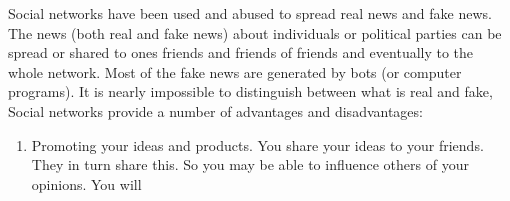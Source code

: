  Social networks have been used and abused to spread real news and fake news. The news (both real and fake news) about individuals or political parties can be spread or shared to 
 ones friends and friends of friends and eventually to the whole network. Most of the fake news are generated by bots (or computer programs). It is nearly impossible to distinguish between what is real and fake, 
Social networks provide a number of advantages and disadvantages:
\begin{enumerate}
    \item Promoting your ideas and products. You share your ideas to your friends. They in turn share this.
    So you may be able to influence others of your opinions. You will 
\end{enumerate}
